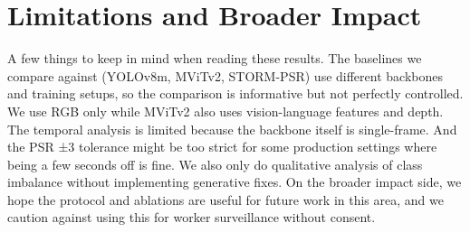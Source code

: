\documentclass[10pt,journal,compsoc]{IEEEtran}
\begin{document}
\FloatBarrier

\section{Limitations and Broader Impact}
\label{sec:limitations}

A few things to keep in mind when reading these results. The baselines we compare against (YOLOv8m, MViTv2, STORM-PSR) use different backbones and training setups, so the comparison is informative but not perfectly controlled. We use RGB only while MViTv2 also uses vision-language features and depth. The temporal analysis is limited because the backbone itself is single-frame. And the PSR ±3 tolerance might be too strict for some production settings where being a few seconds off is fine. We also only do qualitative analysis of class imbalance without implementing generative fixes. On the broader impact side, we hope the protocol and ablations are useful for future work in this area, and we caution against using this for worker surveillance without consent.
\end{document}
